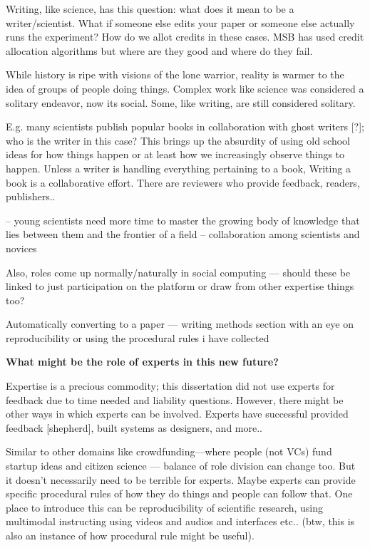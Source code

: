 Writing, like science, has this question: what does it mean to be a writer/scientist. What if someone else edits your paper or someone else actually runs the experiment? How do we allot credits in these cases. MSB has used credit allocation algorithms but where are they good and where do they fail. 

While history is ripe with visions of the lone warrior, reality is warmer to the idea of groups of people doing things. Complex work like science was considered a solitary endeavor, now its social. Some, like writing, are still considered solitary.

E.g. many scientists publish popular books in collaboration with ghost writers [?]; who is the writer in this case? This brings up the absurdity of using old school ideas for how things happen or at least how we increasingly observe things to happen. Unless a writer is handling everything pertaining to a book, Writing a book is a collaborative effort. There are reviewers who provide feedback, readers, publishers.. 

 -- young scientists need more time to master the growing body of knowledge that lies between them and the frontier of a field -- collaboration among scientists and novices

Also, roles come up normally/naturally in social computing — should these be linked to just participation on the platform or draw from other expertise things too?

Automatically converting to a paper — writing methods section with an eye on reproducibility
or using the procedural rules i have collected 

\textbf{What might be the role of experts in this new future?}

Expertise is a precious commodity; this dissertation did not use experts for feedback due to time needed and liability questions. However, there might be other ways in which experts can be involved. Experts have successful provided feedback [shepherd], built systems as designers, and more.. 

Similar to other domains like crowdfunding—where people (not VCs) fund startup ideas  and citizen science — balance of role division can change too. But it doesn’t necessarily need to be terrible for experts. Maybe experts can provide specific procedural rules of how they do things and people can follow that. One place to introduce this can be reproducibility of scientific research, using multimodal instructing using videos and audios and interfaces etc.. (btw, this is also an instance of how procedural rule might be useful).

